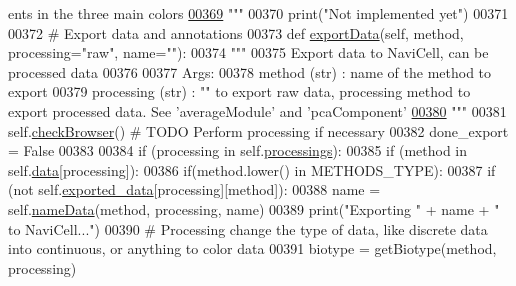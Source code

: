 \begin{DoxyCode}
{      ents in the three main colors}
\hypertarget{navicom_8py_source_l00369}{}\hyperlink{classnavicom_1_1navicom_1_1NaviCom_a369bba5d2dc39a565880bc6f853f0da1}{00369} \textcolor{stringliteral}{        """}
00370         \textcolor{keywordflow}{print}(\textcolor{stringliteral}{"Not implemented yet"})
00371 
00372     \textcolor{comment}{# Export data and annotations}
00373     \textcolor{keyword}{def }\hyperlink{classnavicom_1_1navicom_1_1NaviCom_a7395c2253695b46bf95cd48ed1be6d3e}{exportData}(self, method, processing="raw", name=""):
00374         \textcolor{stringliteral}{"""}
00375 \textcolor{stringliteral}{        Export data to NaviCell, can be processed data}
00376 \textcolor{stringliteral}{}
00377 \textcolor{stringliteral}{        Args:}
00378 \textcolor{stringliteral}{            method (str) : name of the method to export}
00379 \textcolor{stringliteral}{            processing (str) : "" to export raw data, processing method to export
       processed data. See 'averageModule' and 'pcaComponent'}
\hypertarget{navicom_8py_source_l00380}{}\hyperlink{classnavicom_1_1navicom_1_1NaviCom_a7395c2253695b46bf95cd48ed1be6d3e}{00380} \textcolor{stringliteral}{        """}
00381         self.\hyperlink{classnavicom_1_1navicom_1_1NaviCom_aa7aadc5d33a24f0fd5705e363c0fedcb}{checkBrowser}() \textcolor{comment}{# TODO Perform processing if necessary}
00382         done\_export = \textcolor{keyword}{False}
00383 
00384         \textcolor{keywordflow}{if} (processing \textcolor{keywordflow}{in} self.\hyperlink{classnavicom_1_1navicom_1_1NaviCom_a5a255d56e997ddcc653d8f06c741ea13}{processings}):
00385             \textcolor{keywordflow}{if} (method \textcolor{keywordflow}{in} self.\hyperlink{classnavicom_1_1navicom_1_1NaviCom_aa1abff245573ed8406c6bddb4596f093}{data}[processing]):
00386                 \textcolor{keywordflow}{if}(method.lower() \textcolor{keywordflow}{in} METHODS\_TYPE):
00387                     \textcolor{keywordflow}{if} (\textcolor{keywordflow}{not} self.\hyperlink{classnavicom_1_1navicom_1_1NaviCom_a5995e07de24daa015b8b44b1ae0cada7}{exported_data}[processing][method]):
00388                         name = self.\hyperlink{classnavicom_1_1navicom_1_1NaviCom_a8e735eed992a5cf92616113d47eea6ee}{nameData}(method, processing, name)
00389                         \textcolor{keywordflow}{print}(\textcolor{stringliteral}{"Exporting "} + name + \textcolor{stringliteral}{" to NaviCell..."})
00390                         \textcolor{comment}{# Processing change the type of data, like discrete data 
      into continuous, or anything to color data}
00391                         biotype = getBiotype(method, processing)

\end{DoxyCode}
